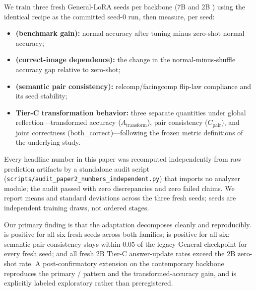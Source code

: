 We train three fresh General-LoRA seeds per backbone (7B \qwen{} and 2B
\smol{}) using the identical recipe as the committed seed-0 run, then
measure, per seed:
\begin{itemize}[leftmargin=*]
  \item \textbf{\dA{} (benchmark gain):} normal accuracy after tuning minus
        zero-shot normal accuracy;
  \item \textbf{\dG{} (correct-image dependence):} the change in the
        normal-minus-shuffle accuracy gap relative to zero-shot;
  \item \textbf{\dC{} (semantic pair consistency):} relcomp/facingcomp
        flip-law compliance and its seed stability;
  \item \textbf{Tier-C transformation behavior:} three separate quantities
        under global reflection---transformed accuracy
        ($A_{\text{transform}}$), pair consistency ($C_{\text{pair}}$), and
        joint correctness (both\_correct)---following the frozen metric
        definitions of the underlying study.
\end{itemize}

Every headline number in this paper was recomputed independently from raw
prediction artifacts by a standalone audit script
(\texttt{scripts/audit\_paper2\_numbers\_independent.py}) that imports no
analyzer module; the audit passed with zero discrepancies and zero
failed claims. We report means and standard deviations across the three
fresh seeds; seeds are independent training draws, not ordered stages.

Our primary finding is that the adaptation decomposes cleanly and
reproducibly. \dA{} is positive for all six fresh seeds across both
families; \dG{} is positive for all six; semantic pair consistency stays
within 0.05 of the legacy General checkpoint for every fresh seed; and all
fresh 2B Tier-C answer-update rates exceed the 2B zero-shot rate. A
post-confirmatory extension on the contemporary \qwennew{} backbone
reproduces the primary \dA{}/\dG{} pattern and the transformed-accuracy
gain, and is explicitly labeled exploratory rather than preregistered.

